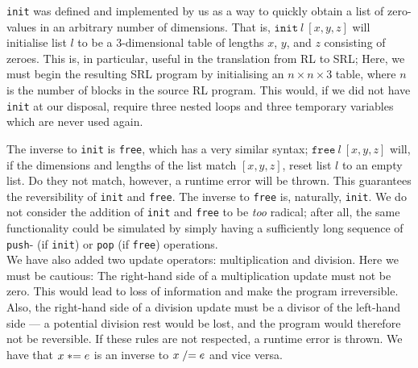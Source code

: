 \texttt{init} was defined and implemented by us as a way to quickly obtain a list of zero-values in an arbitrary number of dimensions. That is, $\texttt{init} \ l \ [x,y,z]$ will initialise list $l$ to be a 3-dimensional table of lengths $x$, $y$, and $z$ consisting of zeroes. This is, in particular, useful in the translation from RL to SRL; Here, we must begin the resulting SRL program by initialising an $n \times n \times 3$ table, where $n$ is the number of blocks in the source RL program. This would, if we did not have \texttt{init} at our disposal, require three nested loops and three temporary variables which are never used again.


The inverse to \texttt{init} is \texttt{free}, which has a very similar syntax; $\texttt{free} \ l \ [x,y,z]$ will, if the dimensions and lengths of the list match $[x,y,z]$, reset list $l$ to an empty list. Do they not match, however, a runtime error will be thrown. This guarantees the reversibility of \texttt{init} and \texttt{free}. The inverse to \texttt{free} is, naturally, \texttt{init}.
We do not consider the addition of \texttt{init} and \texttt{free} to be \textit{too} radical; after all, the same functionality could be simulated by simply having a sufficiently long sequence of \texttt{push}- (if \texttt{init}) or \texttt{pop} (if \texttt{free}) operations.\\

\noindent We have also added two update operators: multiplication and division. Here we must be cautious: The right-hand side of a multiplication update must not be zero. This would lead to loss of information and make the program irreversible. Also, the right-hand side of a division update must be a divisor of the left-hand side --- a potential division rest would be lost, and the program would therefore not be reversible. If these rules are not respected, a runtime error is thrown. We have that $x \mathrel{*}= e$ is an inverse to $x \mathrel{/}= e$ and vice versa. \\

